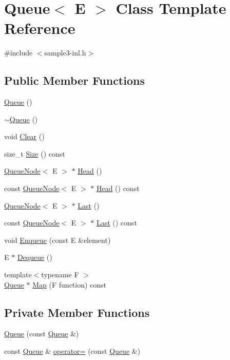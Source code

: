 \hypertarget{classQueue}{\section{\-Queue$<$ \-E $>$ \-Class \-Template \-Reference}
\label{d7/d56/classQueue}
}


{\ttfamily \#include $<$sample3-\/inl.\-h$>$}

\subsection*{\-Public \-Member \-Functions}
\begin{DoxyCompactItemize}
\item 
\hyperlink{classQueue_a9419268280646dc4ab7b01d6fa3741c8}{\-Queue} ()
\item 
\hyperlink{classQueue_a240bdcfcc136e53aeaac3aa454cc26bf}{$\sim$\-Queue} ()
\item 
void \hyperlink{classQueue_aa71d36872f416feaa853788a7a7a7ef8}{\-Clear} ()
\item 
size\-\_\-t \hyperlink{classQueue_ab3bace7b51e6e7d78048999bc2189e27}{\-Size} () const 
\item 
\hyperlink{classQueueNode}{\-Queue\-Node}$<$ \-E $>$ $\ast$ \hyperlink{classQueue_aafc502dcedf6903246577e0d15603092}{\-Head} ()
\item 
const \hyperlink{classQueueNode}{\-Queue\-Node}$<$ \-E $>$ $\ast$ \hyperlink{classQueue_a270a7fd7e09189733ae725811c99c0c3}{\-Head} () const 
\item 
\hyperlink{classQueueNode}{\-Queue\-Node}$<$ \-E $>$ $\ast$ \hyperlink{classQueue_a72c52962e495d31c63555ec29889d1c0}{\-Last} ()
\item 
const \hyperlink{classQueueNode}{\-Queue\-Node}$<$ \-E $>$ $\ast$ \hyperlink{classQueue_aecd94d67910e35f726b7eaa0eda7080b}{\-Last} () const 
\item 
void \hyperlink{classQueue_a3e019cae41556c63cac3a8d99c2e554a}{\-Enqueue} (const \-E \&element)
\item 
\-E $\ast$ \hyperlink{classQueue_a0c48bf5279950c6c26da4d38f1fc41f3}{\-Dequeue} ()
\item 
{\footnotesize template$<$typename F $>$ }\\\hyperlink{classQueue}{\-Queue} $\ast$ \hyperlink{classQueue_a439f9c613fe4576b3568021ca4713251}{\-Map} (\-F function) const 
\end{DoxyCompactItemize}
\subsection*{\-Private \-Member \-Functions}
\begin{DoxyCompactItemize}
\item 
\hyperlink{classQueue_aafce87119954d48c508a3f35ba392e44}{\-Queue} (const \hyperlink{classQueue}{\-Queue} \&)
\item 
const \hyperlink{classQueue}{\-Queue} \& \hyperlink{classQueue_a9ebd0e2259cf32152bf34cee4f9aa607}{operator=} (const \hyperlink{classQueue}{\-Queue} \&)
\end{DoxyCompactItemize}
